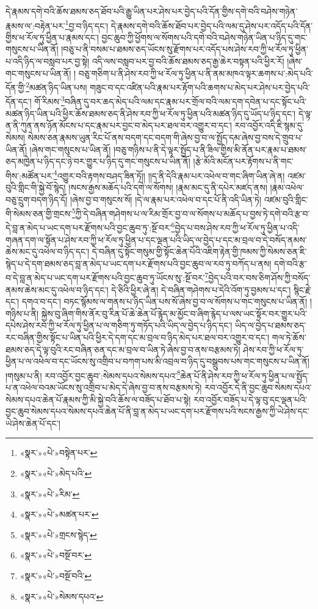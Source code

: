 དེ་རྣམས་དགེ་བའི་ཆོས་ཐམས་ཅད་ཐོབ་པའི་རྒྱུ་ཡིན་པར་ཤེས་པར་བྱེད་པའི་དོན་གྱིས་དགེ་བའི་བཤེས་གཉེན་རྣམས་ལ་:བརྟེན་པར་\footnote{«སྣར་»«པེ་»བསྟེན་པར་}བྱ་བ་ཉིད་དང་། དེ་རྣམས་དགེ་བའི་ཆོས་ཐོབ་པར་བྱེད་པའི་ལམ་དུ་ཤེས་པར་འདོད་པའི་དོན་གྱིས་ཕ་རོལ་ཏུ་ཕྱིན་པ་རྣམས་དང་། བྱང་ཆུབ་ཀྱི་ཕྱོགས་ལ་སོགས་པའི་དགེ་བའི་བཤེས་གཉེན་ཡིན་པ་ཉིད་དུ་གང་གསུངས་པ་ཡིན་ནོ། །བཅུ་པ་ནི་བསམ་པ་ཐམས་ཅད་ཡོངས་སུ་རྫོགས་པར་འདོད་པས་ཤེས་རབ་ཀྱི་ཕ་རོལ་ཏུ་ཕྱིན་པ་འདི་ཉིད་ལ་བསླབ་པར་བྱ་སྟེ། འདི་ལས་བསླབ་པར་བྱ་བའི་ཆོས་ཐམས་ཅད་རྒྱ་ཆེར་བསྟན་པའི་ཕྱིར་རོ། །ཞེས་གང་གསུངས་པ་ཡིན་ནོ། །
བཅུ་གཅིག་པ་ནི་ཤེས་རབ་ཀྱི་ཕ་རོལ་ཏུ་ཕྱིན་པ་ནི་ནམ་མཁའ་ལྟར་ཆགས་པ་:མེད་པའི་དོན་གྱི་\footnote{«སྣར་»«པེ་»མེད་པའི་}མཚན་ཉིད་ཡིན་པས། གཟུང་བ་དང་འཛིན་པའི་རྣམ་པར་རྟོག་པའི་ཆགས་པ་མེད་པར་ཤེས་པར་བྱེད་པའི་དོན་དང་། གོ་རིམས་\footnote{«སྣར་»«པེ་»རིམ་}བཞིན་དུ་བར་ཆད་མེད་པའི་ལམ་དང་རྣམ་པར་གྲོལ་བའི་ལམ་དག་དབེན་པ་དང་སྟོང་པའི་མཚན་ཉིད་ཡིན་པའི་ཕྱིར་ཆོས་ཐམས་ཅད་ནི་ཤེས་རབ་ཀྱི་ཕ་རོལ་ཏུ་ཕྱིན་པའི་མཚན་ཉིད་དུ་ཡོད་པ་ཉིད་དང་། དེ་ལྟ་ན་ནི་ཀུན་ནས་ཉོན་མོངས་པ་དང་རྣམ་པར་བྱང་བ་མེད་པར་ཐལ་བར་འགྱུར་བ་དང་། རབ་འབྱོར་འདི་ཇི་སྙམ་དུ་སེམས། སེམས་ཅན་རྣམས་ཡུན་རིང་པོ་ནས་བདག་དང་བདག་གི་ཞེས་བྱ་བ་ལ་སྤྱོད་དམ་ཞེས་བྱ་བས་དེ་གྲུབ་པ་ཡིན་ནོ། །ཞེས་གང་གསུངས་པ་ཡིན་ནོ། །བཅུ་གཉིས་པ་ནི་དེ་ལྟར་སྤྱོད་པ་ནི་ཟིལ་གྱིས་མི་ནོན་པར་རྣམ་པ་ཐམས་ཅད་མཁྱེན་པ་ཉིད་དང་ཉེ་བར་གྱུར་པ་ཉིད་དུ་གང་གསུངས་པ་ཡིན་ནོ། །རྩེ་མོའི་མངོན་པར་རྟོགས་པ་ནི་གང་གིས་:མཚོན་པར་\footnote{«སྣར་»«པེ་»མཚན་པར་}འགྱུར་བའི་རྟགས་བཤད་ཟིན་ཏོ།། །།ད་ནི་དེའི་རྣམ་པར་འཕེལ་བ་གང་ཞིག་ཡིན་ཞེ་ན། འཛམ་བུའི་གླིང་གི་སྐྱེ་བོ་སྙེད། །སངས་རྒྱས་མཆོད་པའི་དགེ་ལ་སོགས། །རྣམ་མང་དུ་ནི་དཔེར་མཛད་ནས། །རྣམ་འཕེལ་བཅུ་དྲུག་བདག་ཉིད་དོ། །ཞེས་བྱ་བ་གསུངས་སོ། །དེ་ལ་རྣམ་པར་འཕེལ་བ་དང་པོ་ནི་འདི་ཡིན་ཏེ། འཛམ་བུའི་གླིང་གི་སེམས་ཅན་གྱི་གྲངས་\footnote{«སྣར་»«པེ་»གྲངས་སྙེད་}ཀྱི་དེ་བཞིན་གཤེགས་པ་ལ་རིམ་གྲོར་བྱ་བ་ལ་སོགས་པ་མཆོད་པ་བྱས་ཏེ་དགེ་བའི་རྩ་བ་དེ་བླ་ན་མེད་པ་ཡང་དག་པར་རྫོགས་པའི་བྱང་ཆུབ་ཏུ་:སྔོ་བར་\footnote{«སྣར་»«པེ་»བསྔོ་བར་}བྱེད་པ་བས་ཤེས་རབ་ཀྱི་ཕ་རོལ་ཏུ་ཕྱིན་པ་འདི་གཞན་དག་ལ་སྟོན་པ་ཤེས་རབ་ཀྱི་ཕ་རོལ་ཏུ་ཕྱིན་པ་དང་ལྡན་པའི་ཡིད་ལ་བྱེད་པ་དང་མ་བྲལ་བ་དེ་བསོད་ནམས་ཆེས་མང་དུ་འཕེལ་བ་ཉིད་དང་། དེ་བཞིན་དུ་སྟོང་གསུམ་གྱི་སྟོང་ཆེན་པོའི་འཇིག་རྟེན་གྱི་ཁམས་ཀྱི་སེམས་ཅན་ཇི་སྙེད་པ་དེ་དག་ཐམས་ཅད་བླ་ན་མེད་པ་ཡང་དག་པར་རྫོགས་པའི་བྱང་ཆུབ་ལ་རབ་ཏུ་བཀོད་པ་ནས། དགེ་བའི་རྩ་བ་དེ་བླ་ན་མེད་པ་ཡང་དག་པར་རྫོགས་པའི་བྱང་ཆུབ་ཏུ་ཡོངས་སུ་:སྔོ་བར་\footnote{«སྣར་»«པེ་»བསྔོ་བའི་}བྱེད་པའི་བར་བས་ཅིག་ཤོས་ཀྱི་བསོད་ནམས་ཆེས་མང་དུ་འཕེལ་བ་ཉིད་དང་། དེ་ཅིའི་ཕྱིར་ཞེ་ན། དེ་བཞིན་གཤེགས་པ་དེའི་འོག་ཏུ་བྱམས་པ་དང་། སྙིང་རྗེ་དང་། དགའ་བ་དང་། བཏང་སྙོམས་ལ་གནས་པ་ཉིད་ཡིན་པས་སོ་ཞེས་བྱ་བ་ལ་སོགས་པ་གང་གསུངས་པ་ཡིན་ནོ། །གཉིས་པ་ནི། སྐྱེས་བུ་ཞིག་གིས་ནོར་བུ་རིན་པོ་ཆེ་ཆེན་པོ་རྙེད་མ་མྱོང་བ་ཞིག་རྙེད་པ་ལས་ཡང་སྟོར་བར་གྱུར་པའི་དཔེས་ཤེས་རབ་ཀྱི་ཕ་རོལ་ཏུ་ཕྱིན་པ་ལ་གཅིག་ཏུ་གཏོད་པའི་ཡིད་ལ་བྱེད་པ་ཉིད་དང་། ཡིད་ལ་བྱེད་པ་ཐམས་ཅད་རང་བཞིན་གྱིས་སྟོང་པ་ཡིན་པའི་ཕྱིར་དེ་དག་དང་མ་བྲལ་བ་ཉིད་མེད་པར་ཐལ་བར་འགྱུར་བ་དང་། གལ་ཏེ་ཆོས་ཐམས་ཅད་དེ་ལྟ་བུའི་རང་བཞིན་ཅན་དང་མ་བྲལ་བ་ཡིན་ཏེ་ཞེས་བྱ་བ་ནས་བརྩམས་ཏེ། ཤེས་རབ་ཀྱི་ཕ་རོལ་ཏུ་ཕྱིན་པ་ལ་འཕེལ་བ་དང་ཡོངས་སུ་འགྲིབ་པ་བཀག་པས་མི་འབྲལ་བ་ཉིད་དུ་བསྒྲུབས་པས་གང་གསུངས་པ་ཡིན་ནོ། །གསུམ་པ་ནི། རབ་འབྱོར་བྱང་ཆུབ་:སེམས་དཔའ་སེམས་དཔའ་\footnote{«སྣར་»«པེ་»སེམས་དཔའ་}ཆེན་པོ་ནི་ཤེས་རབ་ཀྱི་ཕ་རོལ་ཏུ་ཕྱིན་པ་ལ་སྤྱོད་པ་ན་འཕེལ་བའམ་ཡོངས་སུ་འགྲིབ་པ་མེད་དེ་ཞེས་བྱ་བ་ནས་བརྩམས་ཏེ། རབ་འབྱོར་དེ་ནི་བྱང་ཆུབ་སེམས་དཔའ་སེམས་དཔའ་ཆེན་པོ་རྣམས་ཀྱི་མི་སྐྱེ་བའི་ཆོས་ལ་བཟོད་པ་ཐོབ་པ་སྟེ། རབ་འབྱོར་བཟོད་པ་དེ་ལྟ་བུ་དང་ལྡན་པའི་བྱང་ཆུབ་སེམས་དཔའ་སེམས་དཔའ་ཆེན་པོ་ནི་བླ་ན་མེད་པ་ཡང་དག་པར་རྫོགས་པའི་སངས་རྒྱས་ཀྱི་ཡེ་ཤེས་དང་ཡེ་ཤེས་ཆེན་པོ་དང་། 